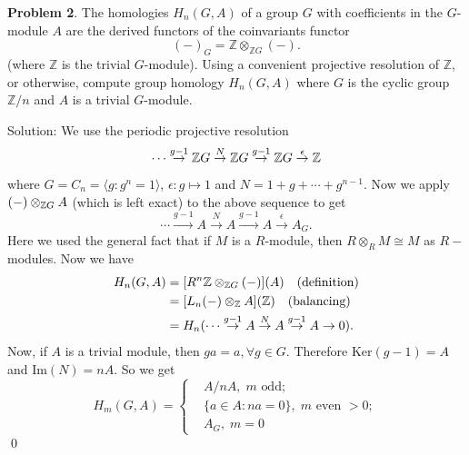 \begin{dang}
    \textbf{Problem 2}.
The homologies $H_n(G,A)$ of a group $G$ with coefficients in the
$G$-module $A$ are the derived functors of the coinvariants functor
\[
(-)_G = \mathbb{Z} \otimes_{\mathbb{Z}G} (-).
\]
(where $\mathbb{Z}$ is the trivial $G$-module). Using a convenient
projective resolution of $\mathbb{Z}$, or otherwise, compute group
homology $H_n(G,A)$ where $G$ is the cyclic group $\mathbb{Z}/n$ and
$A$ is a trivial $G$-module.
\end{dang}
Solution: We use the periodic projective resolution 
\begin{equation}
    \cdots\overset{g-1}{\to} \mathbb{Z} G\overset{N}{\to}\mathbb{Z} G\overset{g-1}{\to}\mathbb{Z} G\overset{\epsilon}{\to}\mathbb{Z} 
\end{equation}
where $G=C_n=\langle g:g^n=1\rangle$, $\epsilon:g\mapsto 1$ and $N=1+g+\cdots+g^{n-1}$. Now we apply  
$(-)\otimes_{\mathbb{Z} G}A$ (which is left exact) to the above sequence to get 
\begin{equation}
    \cdots\overset{g-1}{\to} A\overset{N}{\to}A\overset{g-1}{\to}A\overset{\epsilon}{\to}A_G.
\end{equation}
Here we used the general fact that if $M$ is a $R$-module, then $R\otimes_R M\cong M$ as $R-$modules. 
Now we have
\begin{equation}
    \begin{split}
        H_n(G,A) &= [R^n\mathbb{Z}\otimes_{\mathbb{Z} G}(-)](A)\quad(\text{definition})\\ 
        &=[L_n(-)\otimes_{\mathbb{Z}}A](\mathbb{Z})\quad(\text{balancing})\\
        &= H_n(\cdots\overset{g-1}{\to} A\overset{N}{\to}A\overset{g-1}{\to}A\to0).
    \end{split}
\end{equation}
Now, if $A$ is a trivial module, then $ga=a,\forall g\in G$. Therefore $\text{Ker}(g-1)=A$ and 
$\text{Im}(N)=nA$. So we get 
\begin{equation}
   H_m(G,A) =\left\{\begin{aligned}
        &A/nA,\;m \text{ odd};\\
        &\{a\in A:na = 0\},\;m\text{ even }>0;\\
        &A_G,\;m=0
    \end{aligned}\right.
\end{equation}
\qed



